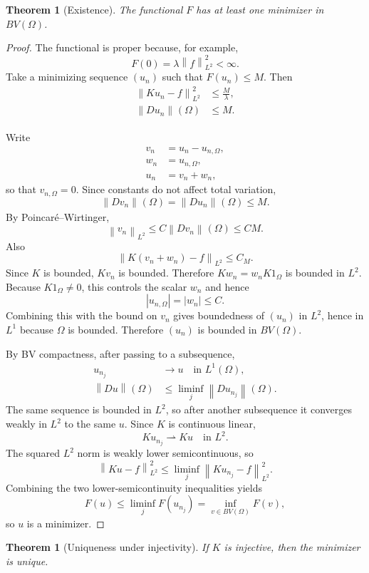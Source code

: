 \documentclass[11pt]{article}
\newcommand{\Om}{\Omega}
\newcommand{\norm}[2][]{\left\lVert #2\right\rVert_{#1}}
\theoremstyle{definition}
\theoremstyle{plain}
\newtheorem{theorem}[definition]{Theorem}
\begin{document}
\begin{theorem}[Existence]
The functional $F$ has at least one minimizer in $BV(\Om)$.
\end{theorem}

\begin{proof}
The functional is proper because, for example,
\[
F(0)=\lambda\norm[L^2]{f}^2<\infty.
\]
Take a minimizing sequence $(u_n)$ such that $F(u_n)\le M$. Then
\begin{align*}
\norm[L^2]{Ku_n-f}^2 &\le \frac{M}{\lambda},\\
\norm{Du_n}(\Om) &\le M.
\end{align*}

Write
\begin{align*}
v_n &= u_n-u_{n,\Om},\\
w_n &= u_{n,\Om},\\
u_n &= v_n+w_n,
\end{align*}
so that $v_{n,\Om}=0$. Since constants do not affect total variation,
\[
\norm{Dv_n}(\Om)=\norm{Du_n}(\Om)\le M.
\]
By Poincar\'e--Wirtinger,
\[
\norm[L^2]{v_n}\le C\norm{Dv_n}(\Om)\le C M.
\]
Also
\[
\norm[L^2]{K(v_n+w_n)-f}\le C_M.
\]
Since $K$ is bounded, $Kv_n$ is bounded. Therefore $Kw_n=w_nK1_{\Om}$ is bounded in $L^2$. Because $K1_{\Om}\neq0$, this controls the scalar $w_n$ and hence
\[
|u_{n,\Om}|=|w_n|\le C.
\]
Combining this with the bound on $v_n$ gives boundedness of $(u_n)$ in $L^2$, hence in $L^1$ because $\Om$ is bounded. Therefore $(u_n)$ is bounded in $BV(\Om)$.

By BV compactness, after passing to a subsequence,
\begin{align*}
u_{n_j} &\to u\quad\text{in }L^1(\Om),\\
\norm{Du}(\Om) &\le\liminf_j\norm{Du_{n_j}}(\Om).
\end{align*}
The same sequence is bounded in $L^2$, so after another subsequence it converges weakly in $L^2$ to the same $u$. Since $K$ is continuous linear,
\[
Ku_{n_j}\rightharpoonup Ku\quad\text{in }L^2.
\]
The squared $L^2$ norm is weakly lower semicontinuous, so
\[
\norm[L^2]{Ku-f}^2
\le\liminf_j\norm[L^2]{Ku_{n_j}-f}^2.
\]
Combining the two lower-semicontinuity inequalities yields
\[
F(u)\le\liminf_j F(u_{n_j})=\inf_{v\in BV(\Om)}F(v),
\]
so $u$ is a minimizer.
\end{proof}

\begin{theorem}[Uniqueness under injectivity]
If $K$ is injective, then the minimizer is unique.
\end{theorem}
\end{document}
